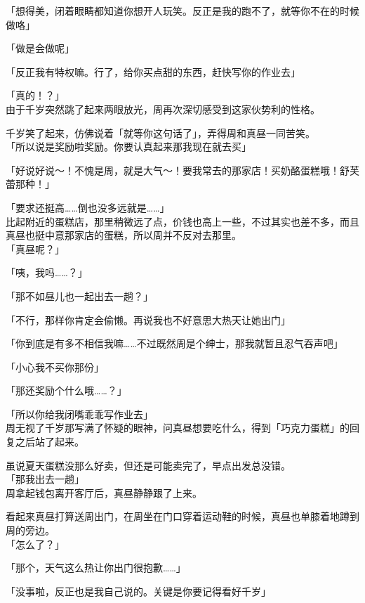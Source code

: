 「想得美，闭着眼睛都知道你想开人玩笑。反正是我的跑不了，就等你不在的时候做咯」

「做是会做呢」

「反正我有特权嘛。行了，给你买点甜的东西，赶快写你的作业去」

「真的！？」\\

由于千岁突然跳了起来两眼放光，周再次深切感受到这家伙势利的性格。

千岁笑了起来，仿佛说着「就等你这句话了」，弄得周和真昼一同苦笑。\\

「所以说是奖励啦奖励。你要认真起来那我现在就去买」

「好说好说～！不愧是周，就是大气～！要我常去的那家店！买奶酪蛋糕哦！舒芙蕾那种！」

「要求还挺高……倒也没多远就是……」\\

比起附近的蛋糕店，那里稍微远了点，价钱也高上一些，不过其实也差不多，而且真昼也挺中意那家店的蛋糕，所以周并不反对去那里。\\

「真昼呢？」

「咦，我吗……？」

「那不如昼儿也一起出去一趟？」

「不行，那样你肯定会偷懒。再说我也不好意思大热天让她出门」

「你到底是有多不相信我嘛……不过既然周是个绅士，那我就暂且忍气吞声吧」

「小心我不买你那份」

「那还奖励个什么哦……？」

「所以你给我闭嘴乖乖写作业去」\\

周无视了千岁那写满了怀疑的眼神，问真昼想要吃什么，得到「巧克力蛋糕」的回复之后站了起来。

虽说夏天蛋糕没那么好卖，但还是可能卖完了，早点出发总没错。\\

「那我出去一趟」\\

周拿起钱包离开客厅后，真昼静静跟了上来。

看起来真昼打算送周出门，在周坐在门口穿着运动鞋的时候，真昼也单膝着地蹲到周的旁边。\\

「怎么了？」

「那个，天气这么热让你出门很抱歉……」

「没事啦，反正也是我自己说的。关键是你要记得看好千岁」

